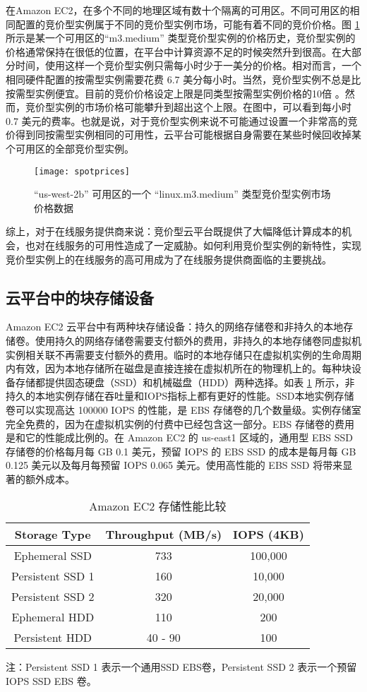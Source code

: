 在Amazon EC2，在多个不同的地理区域有数十个隔离的可用区。不同可用区的相同配置的竞价型实例属于不同的竞价型实例市场，可能有着不同的竞价价格。图 \ref{figure:sp} 所示是某一个可用区的``m3.medium'' 类型竞价型实例的价格历史，竞价型实例的价格通常保持在很低的位置，在平台中计算资源不足的时候突然升到很高。在大部分时间，使用这样一个竞价型实例只需每小时少于一美分的价格。相对而言，一个相同硬件配置的按需型实例需要花费 6.7 美分每小时。当然，竞价型实例不总是比按需型实例便宜。目前的竞价价格设定上限是同类型按需型实例价格的10倍 \cite{AWS_SL:2014}。然而，竞价型实例的市场价格可能攀升到超出这个上限。在图中，可以看到每小时 0.7 美元的费率。也就是说，对于竞价型实例来说不可能通过设置一个非常高的竞价得到同按需型实例相同的可用性，云平台可能根据自身需要在某些时候回收掉某个可用区的全部竞价型实例。
\begin{figure}[]
  \centering
  \texttt{[image: spotprices]}
  \caption{``us-west-2b'' 可用区的一个 ``linux.m3.medium'' 类型竞价型实例市场价格数据}
  \label{figure:sp}
\end{figure}

综上，对于在线服务提供商来说：竞价型云平台既提供了大幅降低计算成本的机会，也对在线服务的可用性造成了一定威胁。如何利用竞价型实例的新特性，实现竞价型实例上的在线服务的高可用成为了在线服务提供商面临的主要挑战。

\subsection{云平台中的块存储设备}
Amazon EC2 云平台中有两种块存储设备：持久的网络存储卷和非持久的本地存储卷。使用持久的网络存储卷需要支付额外的费用，非持久的本地存储卷同虚拟机实例相关联不再需要支付额外的费用。临时的本地存储只在虚拟机实例的生命周期内有效，因为本地存储所在磁盘是直接连接在虚拟机所在的物理机上的。每种块设备存储都提供固态硬盘（SSD）和机械磁盘（HDD）两种选择。如表 \ref{table:ec2storage} 所示，非持久的本地实例存储在吞吐量和IOPS指标上都有更好的性能。SSD本地实例存储卷可以实现高达 100000 IOPS 的性能，是 EBS 存储卷的几个数量级。实例存储室完全免费的，因为在虚拟机实例的付费中已经包含这一部分。EBS 存储卷的费用是和它的性能成比例的。在 Amazon EC2 的 us-east1 区域的，通用型 EBS SSD 存储卷的价格每月每 GB 0.1 美元，预留 IOPS 的 EBS SSD 的成本是每月每 GB 0.125 美元以及每月每预留 IOPS 0.065 美元。使用高性能的 EBS SSD 将带来显著的额外成本。
\begin{table}
\centering
\begin{threeparttable}
\caption{Amazon EC2 存储性能比较}
\label{table:ec2storage}
\begin{tabular}{c|c|c} \hline
Storage Type& Throughput (MB/s)& IOPS (4KB)\\
\hline
Ephemeral SSD & 733 & 100,000\\
Persistent SSD 1 & 160 & 10,000\\
Persistent SSD 2 & 320 & 20,000\\
Ephemeral HDD & 110 & 200 \\
Persistent HDD & 40 - 90 & 100\\
\hline
\end{tabular}
\small 注：Persistent SSD 1 表示一个通用SSD EBS卷，Persistent SSD 2 表示一个预留 IOPS SSD EBS 卷。 
\end{threeparttable}
\end{table}

